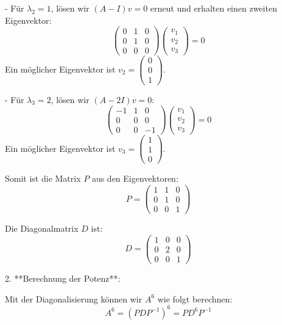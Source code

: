 {   - Für \(\lambda_2 = 1\), lösen wir \((A - I)v = 0\) erneut und erhalten einen zweiten Eigenvektor:
     \[
     \begin{pmatrix}
     0 & 1 & 0 \\
     0 & 1 & 0 \\
     0 & 0 & 0
     \end{pmatrix}
     \begin{pmatrix}
     v_1 \\
     v_2 \\
     v_3
     \end{pmatrix} = 0
     \]
     Ein möglicher Eigenvektor ist \(v_2 = \begin{pmatrix}
     0 \\
     0 \\
     1
     \end{pmatrix}\).

   - Für \(\lambda_3 = 2\), lösen wir \((A - 2I)v = 0\):
     \[
     \begin{pmatrix}
     -1 & 1 & 0 \\
     0 & 0 & 0 \\
     0 & 0 & -1
     \end{pmatrix}
     \begin{pmatrix}
     v_1 \\
     v_2 \\
     v_3
     \end{pmatrix} = 0
     \]
     Ein möglicher Eigenvektor ist \(v_3 = \begin{pmatrix}
     1 \\
     1 \\
     0
     \end{pmatrix}\).

   Somit ist die Matrix \( P \) aus den Eigenvektoren:
   \[
   P = \begin{pmatrix}
   1 & 1 & 0 \\
   0 & 1 & 0 \\
   0 & 0 & 1
   \end{pmatrix}
   \]

   Die Diagonalmatrix \( D \) ist:
   \[
   D = \begin{pmatrix}
   1 & 0 & 0 \\
   0 & 2 & 0 \\
   0 & 0 & 1
   \end{pmatrix}
   \]

2. **Berechnung der Potenz**:

   Mit der Diagonalisierung können wir \( A^6 \) wie folgt berechnen:
   \[ A^6 = (PDP^{-1})^6 = PD^6P^{-1} \]

}
